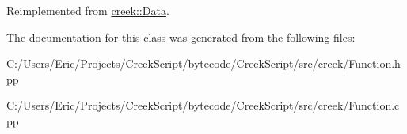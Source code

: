 Reimplemented from \hyperlink{classcreek_1_1_data_a32fa079c6f972eae802a5ac5b83d8a07}{creek\+::\+Data}.



The documentation for this class was generated from the following files\+:\begin{DoxyCompactItemize}
\item 
C\+:/\+Users/\+Eric/\+Projects/\+Creek\+Script/bytecode/\+Creek\+Script/src/creek/Function.\+hpp\item 
C\+:/\+Users/\+Eric/\+Projects/\+Creek\+Script/bytecode/\+Creek\+Script/src/creek/Function.\+cpp\end{DoxyCompactItemize}

